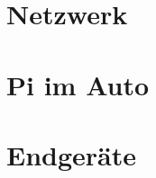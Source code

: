 \documentclass[pflichtenheft.tex]{subfiles}
\begin{document}
\section{Netzwerk}
\section{Pi im Auto}
\section{Endgeräte}
\end{document}
